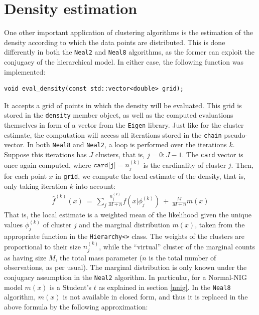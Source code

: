 \section{Density estimation} \label{dens-estim}
One other important application of clustering algorithms is the estimation of the density according to which the data points are distributed.
This is done differently in both the \verb|Neal2| and \verb|Neal8| algorithms, as the former can exploit the conjugacy of the hierarchical model.
In either case, the following function was implemented:
\begin{verbatim}
void eval_density(const std::vector<double> grid);
\end{verbatim}
It accepts a grid of points in which the density will be evaluated.
This grid is stored in the \verb|density| member object, as well as the computed evaluations themselves in form of a vector from the \verb|Eigen| library.
Just like for the cluster estimate, the computation will access all iterations stored in the \verb|chain| pseudo-vector.
In both \verb|Neal8| and \verb|Neal2|, a loop is performed over the iterations $k$.
Suppose this iterations has $J$ clusters, that is, $j=0:J-1$.
The \verb|card| vector is once again computed, where $\texttt{card[j]} = n^{(k)}_j$ is the cardinality of cluster $j$.
Then, for each point $x$ in \verb|grid|, we compute the local estimate of the density, that is, only taking iteration $k$ into account:
\begin{equation}\label{localdens}
	\begin{aligned}
	\hat f^{(k)}(x) \ = \ \sum_j \frac{n^{(k)}_j}{M+n} f\left(x | \phi^{(k)}_j\right) \ + \ \frac{M}{M+n} m(x)
	\end{aligned}
\end{equation}
That is, the local estimate is a weighted mean of the likelihood given the unique values $\phi^{(k)}_j$ of cluster $j$ and the marginal distribution $m(x)$, taken from the appropriate function in the \verb|Hierarchy<>| class.
The weights of the clusters are proportional to their size $n^{(k)}_j$, while the ``virtual'' cluster of the marginal counts as having size $M$, the total mass parameter ($n$ is the total number of observations, as per usual).
The marginal distribution is only known under the conjugacy assumption in the \verb|Neal2| algorithm.
In particular, for a Normal-NIG model $m(x)$ is a Student's $t$ as explained in section \ref{nnig}.
In the \verb|Neal8| algorithm, $m(x)$ is not available in closed form, and thus it is replaced in the above formula by the following approximation:
